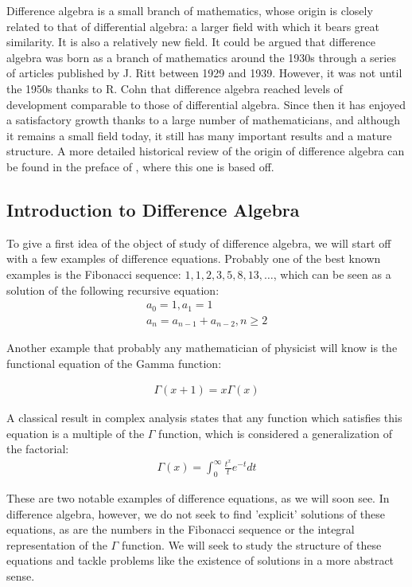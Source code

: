 


Difference algebra is a small branch of mathematics, whose origin is closely related to that of differential algebra: a larger field with which it bears great similarity. It is also a relatively new field.
It could be argued that difference algebra was born as a branch of mathematics around the 1930s through a series of articles published by J. Ritt between 1929 and 1939. However, it was not until the 1950s thanks to R. Cohn 
that difference algebra reached levels of development comparable to those of differential algebra.  Since then it has enjoyed a satisfactory growth thanks to a large number of mathematicians, and although it remains a small field today,
it still has many important results and a mature structure. A more detailed historical review of the origin of difference algebra can be found in the preface of \cite{levin}, where this one is based off.

\subsection{Introduction to Difference Algebra} 

To give a first idea of the object of study of difference algebra, we will start off with a few examples of difference equations. Probably one of the best known examples is the Fibonacci sequence: $1,1,2,3,5,8,13,\ldots$, which can be seen as a solution of the following recursive equation:
\begin{align*}
a_0 = 1,  a_1 = 1 \\ a_n = a_{n-1} + a_{n-2}, n\geq 2
\end{align*}

Another example that probably any mathematician of physicist will know is the functional equation of the Gamma function:

\begin{align*}
\Gamma(x+1) = x \Gamma(x)
\end{align*}

A classical result in complex analysis states that any function which satisfies this equation is a multiple of the $\Gamma$ function,
which is considered a generalization of the factorial:
\begin{align*}
\Gamma(x) = \int_0^\infty{\frac{t^x}{t} e^{-t} dt}
\end{align*}

These are two notable examples of difference equations, as we will soon see. In difference algebra, however, we do not seek to find 'explicit' solutions of these equations,
 as are the numbers in the Fibonacci sequence or the integral representation of the $\Gamma$ function. We will seek to study the structure of these equations and tackle problems like the existence of solutions in a more abstract sense.

